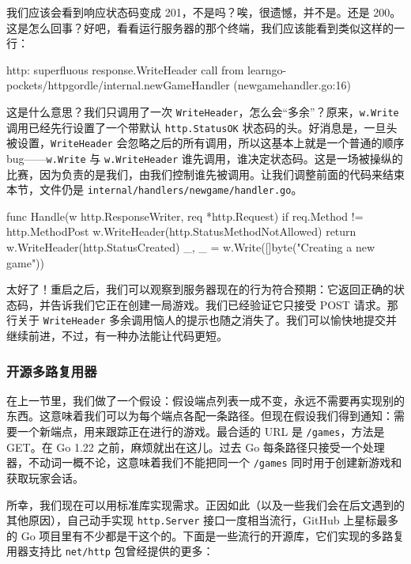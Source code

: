 我们应该会看到响应状态码变成 201，不是吗？唉，很遗憾，并不是。还是 200。这是怎么回事？好吧，看看运行服务器的那个终端，我们应该能看到类似这样的一行：

\begin{shellcode}[]
http: superfluous response.WriteHeader call from
learngo-pockets/httpgordle/internal.newGameHandler (newgamehandler.go:16)
\end{shellcode}

这是什么意思？我们只调用了一次 \texttt{WriteHeader}，怎么会``多余''？原来，\texttt{w.Write} 调用已经先行设置了一个带默认 \texttt{http.StatusOK} 状态码的头。好消息是，一旦头被设置，\texttt{WriteHeader} 会忽略之后的所有调用，所以这基本上就是一个普通的顺序 bug——\texttt{w.Write} 与 \texttt{w.WriteHeader} 谁先调用，谁决定状态码。这是一场被操纵的比赛，因为负责的是我们，由我们控制谁先被调用。让我们调整前面的代码来结束本节，文件仍是 \texttt{internal/handlers/newgame/handler.go}。

\begin{gocode}[title={代码清单 8.9 \texttt{handler.go}：设置响应消息}]
func Handle(w http.ResponseWriter, req *http.Request) {
    if req.Method != http.MethodPost {
        w.WriteHeader(http.StatusMethodNotAllowed)
        return
    }
    w.WriteHeader(http.StatusCreated)
    _, _ = w.Write([]byte("Creating a new game"))
}
\end{gocode}

太好了！重启之后，我们可以观察到服务器现在的行为符合预期：它返回正确的状态码，并告诉我们它正在创建一局游戏。我们已经验证它只接受 POST 请求。那行关于 \texttt{WriteHeader} 多余调用恼人的提示也随之消失了。我们可以愉快地提交并继续前进，不过，有一种办法能让代码更短。

\subsubsection*{开源多路复用器}

在上一节里，我们做了一个假设：假设端点列表一成不变，永远不需要再实现别的东西。这意味着我们可以为每个端点各配一条路径。但现在假设我们得到通知：需要一个新端点，用来跟踪正在进行的游戏。最合适的 URL 是 \texttt{/games}，方法是 GET。在 Go 1.22 之前，麻烦就出在这儿。过去 Go 每条路径只接受一个处理器，不动词一概不论，这意味着我们不能把同一个 \texttt{/games} 同时用于创建新游戏和获取玩家会话。

所幸，我们现在可以用标准库实现需求。正因如此（以及一些我们会在后文遇到的其他原因），自己动手实现 \texttt{http.Server} 接口一度相当流行，GitHub 上星标最多的 Go 项目里有不少都是干这个的。下面是一些流行的开源库，它们实现的多路复用器支持比 \texttt{net/http} 包曾经提供的更多：

